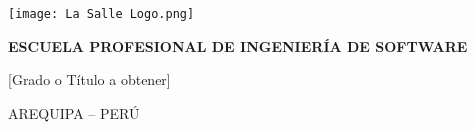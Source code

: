 \begin{titlepage}

    \texttt{[image: La Salle Logo.png]}
    
        \begin{center}
            \vspace*{1cm}
            \large{\textbf{ESCUELA PROFESIONAL DE INGENIERÍA DE SOFTWARE}}
            
            
            \vspace{1.5cm}
            \makeatletter
            \large{\@title}
            \makeatother
            
            
            \vspace{1.5cm}
            \makeatletter
            \@author
            \makeatother
            
            \vspace{1.5cm}
            \makeatletter
            \@assessor
            \makeatother
            
            \vspace{1.5cm}
            [Grado o Título a obtener]
            
            \vfill
            
            AREQUIPA – PERÚ
            
            \vspace{0.5cm}
            \makeatletter
            \@date
            \makeatother
        \end{center}

\end{titlepage}